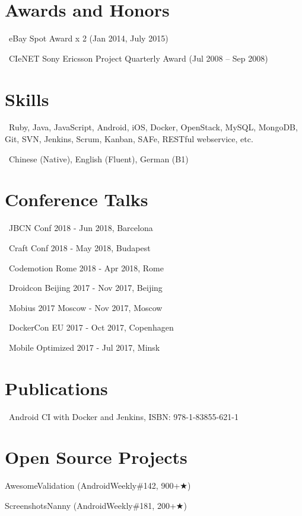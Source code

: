 \documentclass{cv}
\begin{document}



\section*{Awards and Honors}

\faTrophy\ eBay Spot Award x 2 (Jan 2014, July 2015)

\faTrophy\ CIeNET Sony Ericsson Project Quarterly Award (Jul 2008 – Sep 2008)
~\\

\section*{Skills}

\faCode\ Ruby, Java, JavaScript, Android, iOS, Docker, OpenStack, MySQL, MongoDB, Git, SVN, Jenkins, Scrum, Kanban, SAFe, RESTful webservice, etc.

\faLanguage\ Chinese (Native), English (Fluent), German (B1)
~\\

\section*{Conference Talks}

\faMicrophone\ JBCN Conf 2018 - Jun 2018, Barcelona

\faMicrophone\ Craft Conf 2018 - May 2018, Budapest

\faMicrophone\ Codemotion Rome 2018 - Apr 2018, Rome

\faMicrophone\ Droidcon Beijing 2017 - Nov 2017, Beijing

\faMicrophone\ Mobius 2017 Moscow - Nov 2017, Moscow

\faMicrophone\ DockerCon EU 2017 - Oct 2017, Copenhagen

\faMicrophone\ Mobile Optimized 2017 - Jul 2017, Minsk
~\\

\section*{Publications}

\faBook\ Android CI with Docker and Jenkins, ISBN: 978-1-83855-621-1
~\\

\section*{Open Source Projects}

AwesomeValidation (AndroidWeekly\#142, 900+{\DejaVuSans ★})

ScreenshotsNanny (AndroidWeekly\#181, 200+{\DejaVuSans ★})
\end{document}

